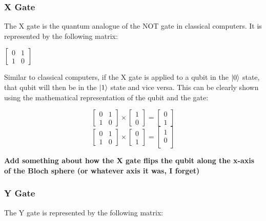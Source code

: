 \documentclass{article}
\begin{document}
\subsubsection{X Gate}
\label{sec:xgate}

The X gate is the quantum analogue of the NOT gate in classical computers. It is represented by the following matrix:

\begin{center}
	$
	\begin{bmatrix}
		0 & 1 \\
		1 & 0
	\end{bmatrix}
	$
\end{center}

Similar to classical computers, if the X gate is applied to a qubit in the $\ket{0}$ state, that qubit will then be in the $\ket{1}$ state and vice versa. This can be clearly
shown using the mathematical representation of the qubit and the gate:

\[
	\begin{bmatrix}
		0 & 1 \\
		1 & 0
	\end{bmatrix}
	\times
	\begin{bmatrix}
		1 \\
		0
	\end{bmatrix}
	=
	\begin{bmatrix}
		0 \\
		1
	\end{bmatrix}
\]
\[
	\begin{bmatrix}
		0 & 1 \\
		1 & 0
	\end{bmatrix}
	\times
	\begin{bmatrix}
		0 \\
		1
	\end{bmatrix}
	=
	\begin{bmatrix}
		1 \\
		0 \\
	\end{bmatrix}
\]

\textbf{Add something about how the X gate flips the qubit along the x-axis of the Bloch sphere (or whatever axis it was, I forget)}

\subsubsection{Y Gate}
\label{sec:ygate}

The Y gate is represented by the following matrix:
\end{document}
